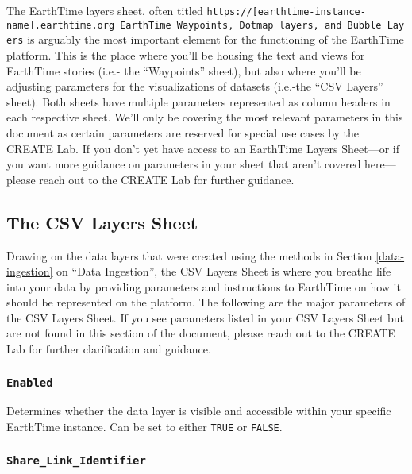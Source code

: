 \documentclass[
  12pt,
]{krantz}
\begin{document}
The EarthTime layers sheet, often titled \texttt{https://{[}earthtime-instance-name{]}.earthtime.org\ EarthTime\ Waypoints,\ Dotmap\ layers,\ and\ Bubble\ Layers} is arguably the most important element for the functioning of the EarthTime platform. This is the place where you'll be housing the text and views for EarthTime stories (i.e.- the ``Waypoints'' sheet), but also where you'll be adjusting parameters for the visualizations of datasets (i.e.-the ``CSV Layers'' sheet). Both sheets have multiple parameters represented as column headers in each respective sheet. We'll only be covering the most relevant parameters in this document as certain parameters are reserved for special use cases by the CREATE Lab. If you don't yet have access to an EarthTime Layers Sheet---or if you want more guidance on parameters in your sheet that aren't covered here---please reach out to the CREATE Lab for further guidance.

\hypertarget{the-csv-layers-sheet}{%
\subsection{The CSV Layers Sheet}\label{the-csv-layers-sheet}}

Drawing on the data layers that were created using the methods in Section \ref{data-ingestion} on ``Data Ingestion'', the CSV Layers Sheet is where you breathe life into your data by providing parameters and instructions to EarthTime on how it should be represented on the platform. The following are the major parameters of the CSV Layers Sheet. If you see parameters listed in your CSV Layers Sheet but are not found in this section of the document, please reach out to the CREATE Lab for further clarification and guidance.

\hypertarget{enabled}{%
\subsubsection*{\texorpdfstring{\texttt{Enabled}}{Enabled}}\label{enabled}}


Determines whether the data layer is visible and accessible within your specific EarthTime instance. Can be set to either \texttt{TRUE} or \texttt{FALSE}.

\hypertarget{share_link_identifier}{%
\subsubsection*{\texorpdfstring{\texttt{Share\_Link\_Identifier}}{Share\_Link\_Identifier}}\label{share_link_identifier}}
\end{document}
